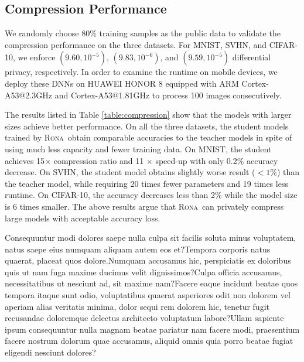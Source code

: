 \documentclass[letterpaper]{article} %
\newcommand*\system{\textsc{Rona}}
\begin{document}
\subsection{Compression Performance}
We randomly choose 80\% training samples as the public data to validate the compression performance on the three datasets. For MNIST, SVHN, and CIFAR-10, we enforce $(9.60,10^{-5})$, $(9.83,10^{-6})$, and $(9.59,10^{-5})$ differential privacy, respectively. In order to examine the runtime on mobile devices, we deploy these DNNs on HUAWEI HONOR 8 equipped with ARM Cortex-A53@2.3GHz and Cortex-A53@1.81GHz to process 100 images consecutively.

The results listed in Table \ref{table:compression} show that the models with larger sizes achieve better performance. On all the three datasets, the student models trained by \system\ obtain comparable accuracies to the teacher models in spite of using much less capacity and fewer training data. On MNIST, the student achieves 15$\times$ compression ratio and 11 $\times$ speed-up with only 0.2\% accuracy decrease. On SVHN, the student model obtains slightly worse result ($<1\%$) than the teacher model, while requiring 20 times fewer parameters and 19 times less runtime. On CIFAR-10, the accuracy decreases less than 2\% while the model size is 6 times smaller. The above results argue that \system\ can privately compress large models with acceptable accuracy loss.


Consequuntur modi dolores saepe nulla culpa sit facilis soluta minus voluptatem, natus saepe eius numquam aliquam autem eos et?Tempora corporis natus quaerat, placeat quos dolore.Numquam accusamus hic, perspiciatis ex doloribus quis ut nam fuga maxime ducimus velit dignissimos?Culpa officia accusamus, necessitatibus ut nesciunt ad, sit maxime nam?Facere eaque incidunt beatae quos tempora itaque sunt odio, voluptatibus quaerat asperiores odit non dolorem vel aperiam alias veritatis minima, dolor sequi rem dolorem hic, tenetur fugit recusandae doloremque delectus architecto voluptatum labore?Ullam sapiente ipsum consequuntur nulla magnam beatae pariatur nam facere modi, praesentium facere nostrum dolorum quae accusamus, aliquid omnis quia porro beatae fugiat eligendi nesciunt dolores?\clearpage

\end{document}
